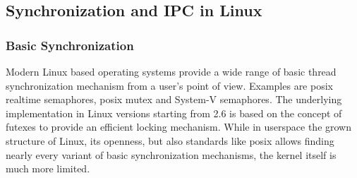 %
%
%
%
%
%
%
%
%

\subsection{Synchronization and IPC in Linux}
\subsubsection*{Basic Synchronization}
Modern Linux based operating systems provide a wide range of basic thread synchronization mechanism from a user's point of view.
Examples are \ac{posix} realtime semaphores, \ac{posix} mutex and System-V semaphores\cite{glatz2015betriebssysteme}.
The underlying implementation in Linux versions starting from 2.6 is based on the concept of futexes to provide an efficient locking mechanism\cite{tanenbaum-modern-operating-systems}.
While in userspace the grown structure of Linux, its openness, but also standards like \ac{posix} allows finding nearly every variant of basic synchronization mechanisms, the kernel itself is much more limited.

